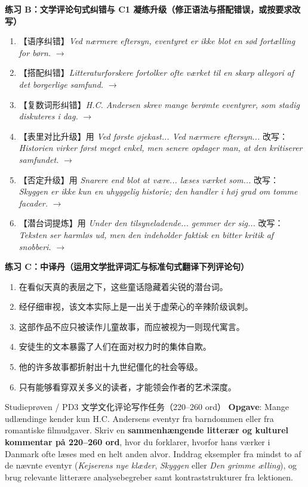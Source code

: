 \textbf{练习 B：文学评论句式纠错与 C1 凝练升级（修正语法与搭配错误，或按要求改写）}
\begin{enumerate}
  \item 【语序纠错】\textit{Ved nærmere eftersyn, eventyret er ikke blot en sød fortælling for børn.} $\rightarrow$
  \item 【搭配纠错】\textit{Litteraturforskere fortolker ofte værket til en skarp allegori af det borgerlige samfund.} $\rightarrow$
  \item 【复数词形纠错】\textit{H.C. Andersen skrev mange berømte eventyrer, som stadig diskuteres i dag.} $\rightarrow$
  \item 【表里对比升级】用 \textit{Ved første øjekast... Ved nærmere eftersyn...} 改写：\textit{Historien virker først meget enkel, men senere opdager man, at den kritiserer samfundet.} $\rightarrow$
  \item 【否定升级】用 \textit{Snarere end blot at være... læses værket som...} 改写：\textit{Skyggen er ikke kun en uhyggelig historie; den handler i høj grad om tomme facader.} $\rightarrow$
  \item 【潜台词提炼】用 \textit{Under den tilsyneladende... gemmer der sig...} 改写：\textit{Teksten ser harmløs ud, men den indeholder faktisk en bitter kritik af snobberi.} $\rightarrow$
\end{enumerate}

\textbf{练习 C：中译丹（运用文学批评词汇与标准句式翻译下列评论句）}
\begin{enumerate}
  \item 在看似天真的表层之下，这些童话隐藏着尖锐的潜台词。
  \item 经仔细审视，该文本实际上是一出关于虚荣心的辛辣阶级讽刺。
  \item 这部作品不应只被读作儿童故事，而应被视为一则现代寓言。
  \item 安徒生的文本暴露了人们在面对权力时的集体自欺。
  \item 他的许多故事都折射出十九世纪僵化的社会等级。
  \item 只有能够看穿双关多义的读者，才能领会作者的艺术深度。
\end{enumerate}


\begin{emailbox}{Studieprøven / PD3 文学文化评论写作任务（220--260 ord）}
\textbf{Opgave}: Mange udlændinge kender kun H.C. Andersens eventyr fra barndommen eller fra romantiske filmudgaver. Skriv en \textbf{sammenhængende litterær og kulturel kommentar på 220--260 ord}, hvor du forklarer, hvorfor hans værker i Danmark ofte læses med en helt anden alvor. Inddrag eksempler fra mindst to af de nævnte eventyr (\textit{Kejserens nye klæder}, \textit{Skyggen} eller \textit{Den grimme ælling}), og brug relevante litterære analysebegreber samt kontraststrukturer fra lektionen.
\end{emailbox}

